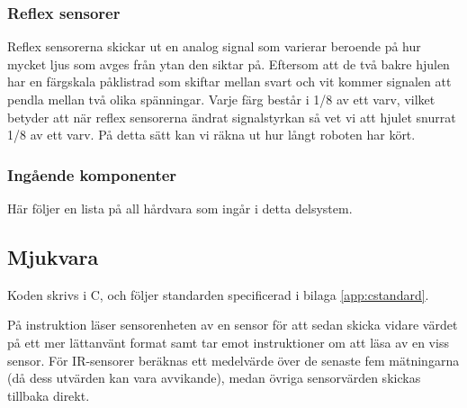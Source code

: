 \documentclass[a4paper,11pt]{article}
\begin{document}
\subsubsection{Reflex sensorer}
Reflex sensorerna skickar ut en analog signal som varierar beroende på hur mycket ljus som avges från ytan den siktar på. Eftersom att de två bakre hjulen har en färgskala påklistrad som skiftar mellan svart och vit kommer signalen att pendla mellan två olika spänningar. Varje färg består i 1/8 av ett varv, vilket betyder att när reflex sensorerna ändrat signalstyrkan så vet vi att hjulet snurrat 1/8 av ett varv. På detta sätt kan vi räkna ut hur långt roboten har kört.

\subsubsection{Ingående komponenter}
Här följer en lista på all hårdvara som ingår i detta delsystem.

\begin{HardwareList}
\end{HardwareList}

\subsection{Mjukvara}

Koden skrivs i C, och följer standarden specificerad i bilaga \ref{app:cstandard}.

På instruktion läser sensorenheten av en sensor för att sedan skicka vidare värdet på ett mer lättanvänt format samt tar emot instruktioner om att läsa av en viss sensor. För IR-sensorer beräknas ett medelvärde över de senaste fem mätningarna (då dess utvärden kan vara avvikande), medan övriga sensorvärden skickas tillbaka direkt.
\end{document}
